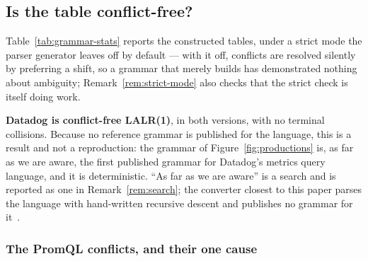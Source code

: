 \iffull\fi

\subsection{Is the table conflict-free?}

Table~\ref{tab:grammar-stats} reports the constructed tables, under a strict mode the
parser generator leaves off by default --- with it off, conflicts are resolved silently
by preferring a shift, so a grammar that merely builds has demonstrated nothing about
ambiguity; Remark~\ref{rem:strict-mode} also checks that the strict check is itself
doing work.

\begin{table}[htbp]\centering\footnotesize

\caption{Constructed LALR(1) tables. v1 is the grammar inferred from vendor
documentation alone; v2 adds the productions the corpus showed were missing
(\S\ref{sec:datadog-inference}).}
\label{tab:grammar-stats}
\end{table}

\noindent
\textbf{Datadog is conflict-free LALR(1)}, in both versions, with no terminal
collisions. Because no reference grammar is published for the language, this is a result
and not a reproduction: the grammar of Figure~\ref{fig:productions} is, as far as we are
aware, the first published grammar for Datadog's metrics query language, and it is
deterministic. ``As far as we are aware'' is a search and is reported as one in
Remark~\ref{rem:search}; the converter closest to this paper parses the language with
hand-written recursive descent and publishes no grammar for it~\citep{dd2dash0}.

\subsubsection{The PromQL conflicts, and their one cause}
\label{sec:promql-conflict}

